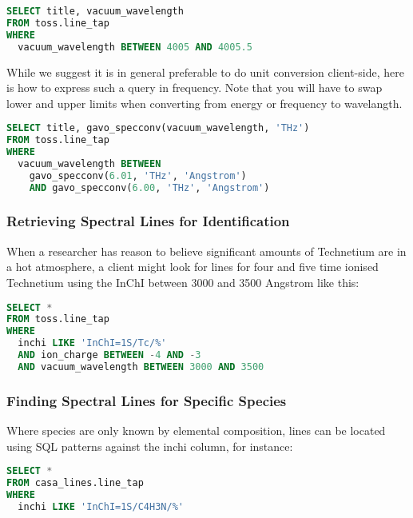 \documentclass[11pt,a4paper]{ivoa}
\begin{document}
\begin{lstlisting}[language=SQL]
SELECT title, vacuum_wavelength
FROM toss.line_tap
WHERE
  vacuum_wavelength BETWEEN 4005 AND 4005.5
\end{lstlisting}

While we suggest it is in general preferable to do unit conversion
client-side, here is how to express such a query in
frequency.
Note that you will have to swap lower and upper limits when converting
from energy or frequency to wavelangth.

\begin{lstlisting}[language=SQL]
SELECT title, gavo_specconv(vacuum_wavelength, 'THz')
FROM toss.line_tap
WHERE
  vacuum_wavelength BETWEEN 
    gavo_specconv(6.01, 'THz', 'Angstrom')
    AND gavo_specconv(6.00, 'THz', 'Angstrom')
\end{lstlisting}


\subsubsection{Retrieving Spectral Lines for Identification}

When a researcher has reason to believe significant amounts of
Technetium are in a hot atmosphere, a client might look for lines for
four and five time ionised Technetium using the InChI between 3000 and
3500 Angstrom like this:

\begin{lstlisting}[language=SQL]
SELECT *
FROM toss.line_tap
WHERE
  inchi LIKE 'InChI=1S/Tc/%'
  AND ion_charge BETWEEN -4 AND -3
  AND vacuum_wavelength BETWEEN 3000 AND 3500
\end{lstlisting}


\subsubsection{Finding Spectral Lines for Specific Species}

Where species are only known by elemental composition, lines can be
located using SQL patterns against the inchi column, for instance:

\begin{lstlisting}[language=SQL]
SELECT *
FROM casa_lines.line_tap
WHERE
  inchi LIKE 'InChI=1S/C4H3N/%'
\end{lstlisting}
\end{document}
